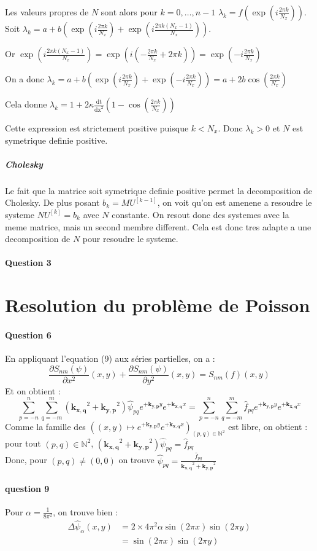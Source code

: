 \documentclass{article}
\newcommand{\dx}{\mathrm{dx}}
\newcommand{\dt}{\mathrm{dt}}
\newcommand{\pd}[2]{\dfrac{\partial#1}{\partial#2}}
\newcommand{\complex}[1]{\bm{#1}}
\newcommand{\kxq}{\complex{k_{x,q}}}
\newcommand{\kyp}{\complex{k_{y,p}}}
\begin{document}
Les valeurs propres de $N$ sont alors pour $k=0,\dots,n-1$ $\lambda_k=f\left(\exp\left(i\frac{2\pi k}{N_x}\right)\right)$.
Soit $\lambda_k=a+b\left(\exp\left(i\frac{2\pi k}{N_x}\right)+\exp\left(i\frac{2\pi k(N_x-1)}{N_x}\right)\right)$.

Or $\exp\left(i\frac{2\pi k(N_x-1)}{N_x}\right)=\exp\left(i(-\frac{2\pi k}{N_x}+2\pi k)\right)=\exp\left(-i\frac{2\pi k}{N_x}\right)$

On a donc $\lambda_k=a+b\left(\exp\left(i\frac{2\pi k}{N_x}\right)+\exp\left(-i\frac{2\pi k}{N_x}\right)\right)=a+2b\cos(\frac{2\pi k}{N_x})$

Cela donne $\lambda_k = 1 + 2\kappa\frac{\dt}{\dx^2}\left(1-\cos\left(\frac{2\pi k}{N_x}\right)\right)$

Cette expression est strictement positive puisque $k < N_x$. Donc $\lambda_k > 0$ et $N$ est symetrique definie positive.

\subparagraph{Cholesky} Le fait que la matrice soit symetrique definie positive permet la decomposition de Cholesky. De plus posant $b_k=MU^{[k
-1]}$, on voit qu'on est amenene a resoudre le systeme $NU^{[k]}=b_k$ avec $N$ constante. On resout donc des systemes avec la meme matrice, mais un second membre different. Cela est donc tres adapte a une decomposition de $N$ pour resoudre le systeme.

\paragraph{Question 3}


\section{Resolution du problème de Poisson}

\paragraph{Question 6}
En appliquant l'equation (9) aux séries partielles, on a :
\begin{equation}
	\pd{S_{nm}(\psi)}{x^2}(x,y)
    + 
	\pd{S_{nm}(\psi)}{y^2}(x,y)
	= S_{nm}(f)(x,y)
    \label{eq:poisson}
\end{equation}
Et on obtient :
\begin{equation*}
    \sum_{p=-n}^{n} \sum_{q=-m}^{m} (\kxq^2 + \kyp^2) \hat{\psi}_{pq} e^{+\kyp y} e^{+\kxq x}
	=
		\sum_{p=-n}^{n} \sum_{q=-m}^{m}\hat{f}_{pq} e^{+\kyp y} e^{+\kxq x}
\end{equation*}
Comme la famille des \(((x, y)\mapsto e^{+\kyp y} e^{+\kxq x})_{(p,q)\in\mathbb N^2}\)
est libre, on obtient : pour tout \((p,q)\in\mathbb N^2\), \((\kxq^2 + \kyp^2) \hat{\psi}_{pq} = \hat{f}_{pq}\)
\\
Donc, pour \((p,q)\neq(0,0)\) on trouve \(\hat{\psi}_{pq} = \frac{\hat{f}_{pq}}{\kxq^2 + \kyp^2}\)

\paragraph{question 9}
Pour \(\alpha = \frac{1}{8\pi^2}\), on trouve bien :
\begin{align*}
	\Delta \hat{\psi}_{\alpha}(x,y) & = 2\times4\pi^2\alpha\sin(2\pi x)\sin(2\pi y)\\
	& = \sin(2\pi x)\sin(2\pi y)
\end{align*}
\end{document}
